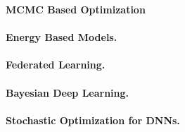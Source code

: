 \documentclass[twoside,11pt]{article}
\begin{document}
\lipsum[35]

\vspace{0.15in}
\textbf{MCMC Based Optimization} 
\vspace{0.08in}

\lipsum[35]

\newpage


\textbf{} 
\vspace{0.2in}

\lipsum[35]

\vspace{0.08in}
\paragraph{Energy Based Models.} \lipsum[35]

\vspace{0.08in}
\paragraph{Federated Learning.} \lipsum[35]

\vspace{0.08in}
\paragraph{Bayesian Deep Learning.} \lipsum[35]

\vspace{0.08in}
\paragraph{Stochastic Optimization for DNNs.} \lipsum[35]


\newpage



\textbf{}
\vspace{-0.3in}
\nocite{*}

\end{document}
